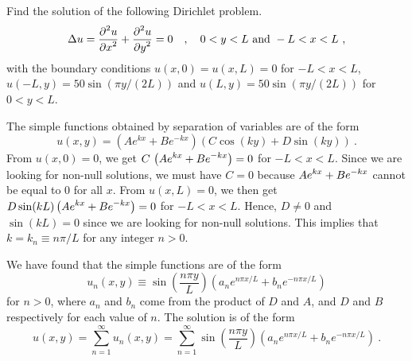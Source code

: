 \begin{egg}
Find the solution of the following Dirichlet problem.
\[
\Delta u = \frac{\displaystyle \partial^{2}{u}} {\displaystyle \partial x^{2}} + \frac{\displaystyle \partial^{2}{u}} {\displaystyle \partial y^{2}} = 0 \quad ,
\quad 0 < y < L \ \text{and} \ -L < x < L \ ,
\]
with the boundary conditions
$u(x,0) = u(x,L) = 0$ for $-L<x<L$,\\
$u(-L,y) = 50 \sin\left(\pi y/(2L)\right)$ and
$u(L,y) = 50 \sin\left(\pi y/(2L)\right)$ for $0<y<L$.

The simple functions obtained by separation of variables are of the
form
\[
u(x,y) = \left( A e^{kx} + B e^{-kx} \right)
\left(C \cos(ky) + D \sin(ky)\right) \ .
\]
From $u(x,0) = 0$, we get
$\displaystyle C\,\left(A e^{kx} + B e^{-kx}\right)=0$ for
$-L<x<L$.  Since we are looking for non-null solutions, we must have
$C=0$ because $\displaystyle A e^{kx} + B e^{-kx}$ cannot be equal to
$0$ for all $x$.  From $u(x,L) = 0$, we then get 
$\displaystyle D\sin(kL)\left(A e^{kx} + B e^{-kx}\right)=0$ for $-L<x<L$.
Hence, $D\neq 0$ and $\sin(kL)=0$ since we are looking for non-null
solutions.  This implies that $k = k_n \equiv n\pi/L$ for any integer $n>0$.

We have found that the simple functions are of the form
\[
u_n(x,y) \equiv \sin\left(\frac{n\pi y}{L}\right)
\left(a_n e^{n\pi x/L} + b_n e^{-n\pi x/L}\right)
\]
for $n > 0$, where $a_n$ and $b_n$ come from the product of $D$ and
$A$, and $D$ and $B$ respectively for each value of $n$.  The solution
is of the form
\[
u(x,y) = \sum_{n=1}^\infty u_n(x,y) = 
\sum_{n=1}^\infty \sin\left(\frac{n\pi y}{L}\right)
\left(a_n e^{n\pi x/L} + b_n e^{-n\pi x/L}\right) \ .
\]


\end{egg}
